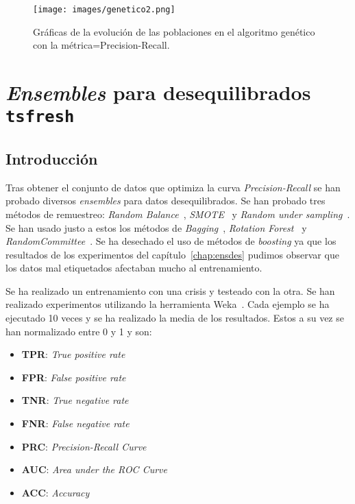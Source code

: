 \documentclass[a4paper,12pt,twoside,oldfontcommands]{memoir}
\begin{document}
	\begin{figure}
		\centering
		\texttt{[image: images/genetico2.png]}
		\caption{Gráficas de la evolución de las poblaciones en el algoritmo genético con la métrica=Precision-Recall.}
		\label{fig:genetico2}
	\end{figure}
	
	\chapter{\textit{Ensembles} para desequilibrados \texttt{tsfresh}}
	\section{Introducción}
	Tras obtener el conjunto de datos que optimiza la curva \textit{Precision-Recall} se han probado diversos \textit{ensembles} para datos desequilibrados. Se han probado tres métodos de remuestreo: \textit{Random Balance}~\cite{diez2015random}, \textit{SMOTE}~\cite{galar2012review} y \textit{Random under sampling}~\cite{diez2015diversity}. Se han usado justo a estos los métodos de \textit{Bagging}~\cite{galar2012review}, \textit{Rotation Forest}~\cite{rodriguez2006rotation} y \textit{RandomCommittee}~\cite{diez2015diversity}. Se ha desechado el uso de métodos de \textit{boosting} ya que los resultados de los experimentos del capítulo~\ref{chap:ensdes} pudimos observar que los datos mal etiquetados afectaban mucho al entrenamiento.
	
	Se ha realizado un entrenamiento con una crisis y testeado con la otra. Se han realizado experimentos utilizando la herramienta Weka~\cite{hall2009weka}. Cada ejemplo se ha ejecutado 10 veces y se ha realizado la media de los resultados. Estos a su vez se han normalizado entre 0 y 1 y son: 
	\begin{itemize}
		\item \textbf{TPR}: \textit{True positive rate}
		\item \textbf{FPR}: \textit{False positive rate}
		\item \textbf{TNR}: \textit{True negative rate}
		\item \textbf{FNR}: \textit{False negative rate}
		\item \textbf{PRC}: \textit{Precision-Recall Curve}
		\item \textbf{AUC}: \textit{Area under the ROC Curve}
		\item \textbf{ACC}: \textit{Accuracy}
	\end{itemize}
	
\end{document}
